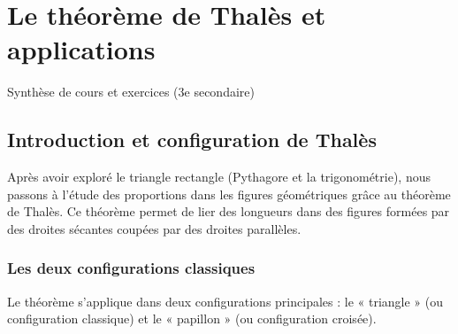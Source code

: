 \documentclass[../main.tex]{subfiles}
\begin{document}
\ifSubfilesClassLoaded{\PageLegaleChapitre}{}

\chapter{Le théorème de Thalès et applications}
\label{chap:thales-geometrie-metrique}

\begin{center}
  \large Synthèse de cours et exercices (3e secondaire)
\end{center}

\section{Introduction et configuration de Thalès}

Après avoir exploré le triangle rectangle (Pythagore et la trigonométrie), nous passons à l'étude des proportions dans les figures géométriques grâce au théorème de Thalès. Ce théorème permet de lier des longueurs dans des figures formées par des droites sécantes coupées par des droites parallèles.

\subsection{Les deux configurations classiques}

Le théorème s'applique dans deux configurations principales : le « triangle » (ou configuration classique) et le « papillon » (ou configuration croisée).
\end{document}
